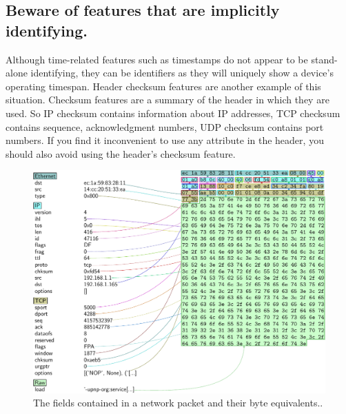 \documentclass[journal]{IEEEtran}
\begin{document}
\subsection{Beware of features  that are implicitly identifying.}  Although time-related features such as timestamps do not appear to be stand-alone identifying, they can be identifiers as they will uniquely show a device's operating timespan. Header checksum features are another example of this situation. Checksum features are a summary of the header in which they are used. So IP checksum contains information about IP addresses, TCP checksum contains sequence,  acknowledgment  numbers, UDP checksum  contains  port numbers.  If you find it inconvenient to use any attribute in the header, you should also avoid using the header's checksum feature.

\begin{figure}[ht]
	\centerline{\includegraphics[width=1\columnwidth]{images/bytes.pdf}}
	\caption{The fields contained in a network packet and their byte equivalents..}
	\label{fig:bytes}
\end{figure}
\end{document}
